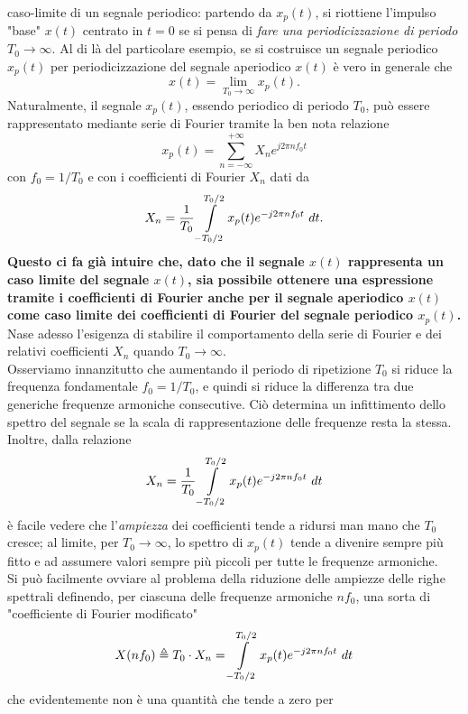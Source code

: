\documentclass[12pt,oneside,openany]{memoir}
\numberwithin{equation}{subsection}
\newcommand{\dt}{\ dt}
\begin{document}
caso-limite di un segnale periodico: partendo da $x_p(t)$, si riottiene
l'impulso "base" $x(t)$ centrato in $t = 0$ se si pensa di \textit{fare una
periodicizzazione di periodo $T_0 \rightarrow \infty$}. Al di l\`a del
particolare esempio, se si costruisce un segnale periodico $x_p(t)$ per
periodicizzazione del segnale aperiodico $x(t)$ \`e vero in generale che
\begin{equation}
	x(t) = \lim_{T_0 \rightarrow \infty} x_p(t).
\end{equation}
Naturalmente, il segnale $x_p(t)$, essendo periodico di periodo $T_0$, pu\`o
essere rappresentato mediante serie di Fourier tramite la ben nota relazione
\[
	x_p(t) = \sum_{n = -\infty}^{+\infty} X_n e^{j 2 \pi n f_0 t}
\]
con $f_0 = 1/T_0$ e con i coefficienti di Fourier $X_n$ dati da
\[
	X_n = \frac{1}{T_0} \int\displaylimits_{-T_0/2}^{T_0/2} x_p(t)
	e^{-j 2 \pi n f_0 t} \dt.
\]
\textbf{Questo ci fa gi\`a intuire che, dato che il segnale $x(t)$ rappresenta
un caso limite del segnale $x(t)$, sia possibile ottenere una espressione
tramite i coefficienti di Fourier anche per il segnale aperiodico $x(t)$ come
caso limite dei coefficienti di Fourier del segnale periodico $x_p(t)$.}
\bigbreak
Nase adesso l'esigenza di stabilire il comportamento della serie di Fourier e
dei relativi coefficienti $X_n$ quando $T_0 \rightarrow \infty$.\\
Osserviamo innanzitutto che aumentando il periodo di ripetizione $T_0$ si riduce
la frequenza fondamentale $f_0 = 1/T_0$, e quindi si riduce la differenza tra due
generiche frequenze armoniche consecutive. Ci\`o determina un infittimento dello
spettro del segnale se la scala di rappresentazione delle frequenze resta la
stessa. Inoltre, dalla relazione 
\[
	X_n = \frac{1}{T_0} \int\displaylimits_{-T_0/2}^{T_0/2} x_p(t)
	e^{-j 2 \pi n f_0 t} \dt
\]
\`e facile vedere che l'\textit{ampiezza} dei coefficienti tende a ridursi man
mano che $T_0$ cresce; al limite, per $T_0 \rightarrow \infty$, lo spettro di
$x_p(t)$ tende a divenire sempre pi\`u fitto e ad assumere valori sempre pi\`u
piccoli per tutte le frequenze armoniche.\\
Si pu\`o facilmente ovviare al problema della riduzione delle ampiezze delle
righe spettrali definendo, per ciascuna delle frequenze armoniche $nf_0$, una
sorta di "coefficiente di Fourier modificato"
\begin{equation}
	X(nf_0) \triangleq T_0 \cdot X_n = \int\displaylimits_{-T_0/2}^{T_0/2}
	x_p(t) e^{-j 2 \pi n f_0 t} \dt
\end{equation}
che evidentemente non \`e una quantit\`a che tende a zero per
\end{document}
